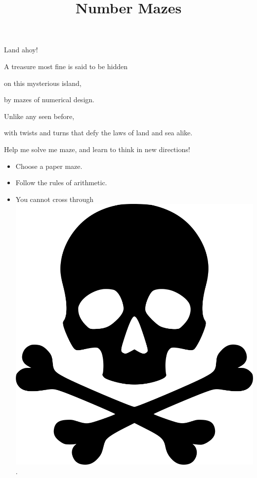 \documentclass{../exhibit}
\title{Number Mazes}
\begin{document}
\begin{context}

Land ahoy!

A treasure most fine is said to be hidden


on this mysterious island, 


by mazes of numerical design.



Unlike any seen before,


with twists and turns that defy the laws of land and sea alike.



Help me solve me maze, and learn to think in new directions!
\end{context}

\begin{directions}
  \begin{itemize}
    \item Choose a paper maze.
    \item Follow the rules of arithmetic.
    \item You cannot cross through \includegraphics[height=.5in]{skullBones.png}.
\end{itemize}
\end{directions}
\end{document}
